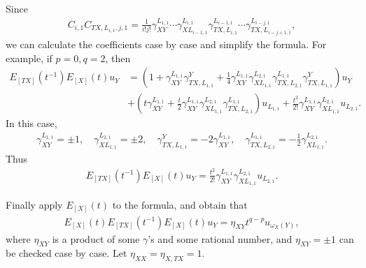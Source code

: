 \documentclass[12pt]{amsart}
\begin{document}
Since
\begin{align*}
    C_{i,1} C_{TX,L_{i,1},j,1} = \frac{1}{i!j!}\gamma_{XY}^{L_{1,1}} \cdots \gamma_{XL_{i-1,1}}^{L_{i,1}}  \gamma_{TX,L_{i,1}}^{L_{i-1,1}} \cdots \gamma_{TX,L_{i-j+1,1}}^{L_{i-j,1}},
\end{align*}
we can calculate the coefficients case by case and simplify the formula.
For example, if $p=0,q=2$, then 
\begin{align*}
    E_{[TX]}(t^{-1}) E_{[X]}(t)u_Y &=(1+\gamma_{XY}^{L_{1,1}}\gamma_{TX,L_{1,1}}^Y+\frac{1}{4}\gamma_{XY}^{L_{1,1}}\gamma_{XL_{1,1}}^{L_{2,1}}\gamma_{TX,L_{2,1}}^{L_{1,1}}\gamma_{TX,L_{1,1}}^Y) u_Y \\
    &+ (t\gamma_{XY}^{L_{1,1}} + \frac{t}{2}\gamma_{XY}^{L_{1,1}}\gamma_{XL_{1,1}}^{L_{2,1}}\gamma_{TX,L_{2,1}}^{L_{1,1}} ) u_{L_{1,1}} + \frac{t^2}{2!} \gamma_{XY}^{L_{1,1}}\gamma_{XL_{1,1}}^{L_{2,1}} u_{L_{2,1}}.
\end{align*}
In this case, 
\begin{align*}
    \gamma_{XY}^{L_{1,1}} = \pm 1, \quad \gamma_{XL_{1,1}}^{L_{2,1}} = \pm 2, \quad \gamma_{TX,L_{1,1}}^Y = -2\gamma_{XY}^{L_{1,1}} , \quad \gamma_{TX,L_{2,1}}^{L_{1,1}} = -\frac{1}{2} \gamma_{XL_{1,1}}^{L_{2,1}}.
\end{align*}
Thus 
\begin{align*}
    E_{[TX]}(t^{-1}) E_{[X]}(t)u_Y = \frac{t^2}{2!} \gamma_{XY}^{L_{1,1}}\gamma_{XL_{1,1}}^{L_{2,1}} u_{L_{2,1}} .
\end{align*}

Finally apply $E_{[X]}(t)$ to the formula, and obtain that 
\begin{align*}
    E_{[X]}(t) E_{[TX]}(t^{-1}) E_{[X]}(t) u_Y = \eta_{XY} t^{q-p} u_{\omega_X(Y)},
\end{align*}
where $\eta_{XY}$ is a product of some $\gamma$'s and some rational number, and $\eta_{XY} = \pm 1$ can be checked case by case.
Let $\eta_{XX} =  \eta_{X,TX} = 1$. 
\end{document}
